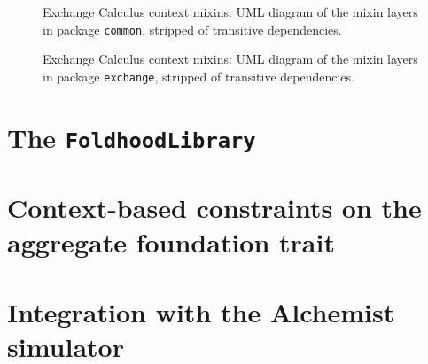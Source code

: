 \begin{figure}
    \centering
    \caption{Exchange Calculus context mixins: \ac{UML} diagram of the mixin layers in package \texttt{common}, stripped of transitive dependencies.}
    \label{fig:context-mixins-common}
    \bigskip
    \resizebox{\linewidth}{!}{
        
    }
\end{figure}

\begin{figure}
    \centering
    \caption{Exchange Calculus context mixins: \ac{UML} diagram of the mixin layers in package \texttt{exchange}, stripped of transitive dependencies.}
    \label{fig:context-mixins-exchange}
    \bigskip
    \resizebox{\linewidth}{!}{
        
    }
\end{figure}

\section{The \texttt{FoldhoodLibrary}}

\section{Context-based constraints on the aggregate foundation trait}

\section{Integration with the Alchemist simulator}
